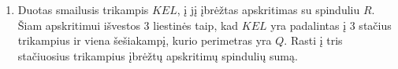 \begin{enumerate}
  \item Duotas smailusis  trikampis $KEL$, į jį įbrėžtas
    apskritimas su spinduliu $R$. Šiam apskritimui išvestos 3
    liestinės taip, kad $KEL$ yra padalintas į 3 stačius
    trikampius ir viena šešiakampį, kurio perimetras yra $Q$.
    Rasti į tris stačiuosius trikampius įbrėžtų apskritimų
    spindulių sumą. 

\end{enumerate}
